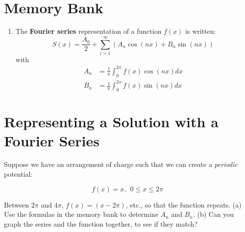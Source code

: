 \documentclass[12pt]{article}
\begin{document}
\maketitle

\section{Memory Bank}

\begin{enumerate}
\item The \textbf{Fourier series} representation of a function $f(x)$ is written:
\begin{equation}
S(x) = \frac{A_0}{2}+\sum_{i=1}^{\infty} \left( A_n \cos(nx) + B_n \sin(nx) \right)
\end{equation}
with
\begin{align}
A_n &= \frac{1}{\pi} \int_0^{2\pi} f(x) \cos(nx) dx \\
B_n &= \frac{1}{\pi} \int_0^{2\pi} f(x) \sin(nx) dx
\end{align}
\end{enumerate}

\section{Representing a Solution with a Fourier Series}

Suppose we have an arrangement of charge such that we can create a \textit{periodic} potential:

\begin{equation}
f(x) = x, ~~ 0 \leq x \leq 2\pi
\end{equation}

Between $2\pi$ and $4\pi$, $f(x) = (x-2\pi)$, etc., so that the function repeats.  (a) Use the formulas in the memory bank to determine $A_n$ and $B_n$.  (b) Can you graph the series and the function together, to see if they match?
\end{document}
